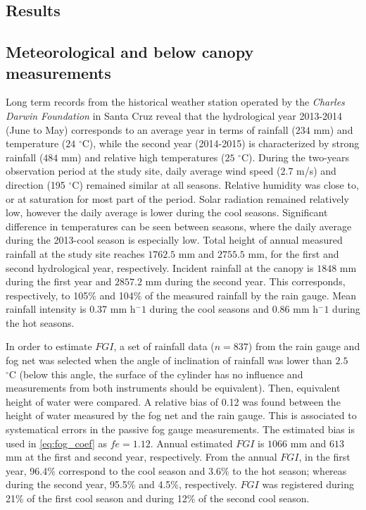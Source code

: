 \documentclass[a4paper,12pt]{article}
\begin{document}
\begin{linenumbers}
\section{Results}
\subsection{Meteorological and below canopy measurements}
Long term records from the historical weather station operated by the \emph{Charles Darwin Foundation} in Santa Cruz reveal that the hydrological year 2013-2014 (June to May) corresponds to an average year in terms of rainfall ($234$ $\mathrm{{mm}}$) and temperature ($24$ $\mathrm{^{\circ}C}$), while the second year (2014-2015) is characterized by strong rainfall ($484$ $\mathrm{{mm}}$) and relative high temperatures ($25$ $\mathrm{^{\circ}C}$). During the two-years observation period at the study site, daily average wind speed (2.7 m/s) and direction (195 $\mathrm{^{\circ}C}$) remained similar at all seasons. Relative humidity was close to, or at saturation for most part of the period. Solar radiation remained relatively low, however the daily average is lower during the cool seasons. Significant difference in temperatures can be seen between seasons, where the daily average during the 2013-cool season is especially low. Total height of annual measured rainfall at the study site reaches $1762.5$ $\mathrm{{mm}}$ and $2755.5$ $\mathrm{{mm}}$, for the first and second hydrological year, respectively. Incident rainfall at the canopy is $1848$ $\mathrm{{mm}}$ during the first year and $2857.2$ $\mathrm{{mm}}$ during the second year. This corresponds, respectively, to 105\% and 104\% of the measured rainfall by the rain gauge. Mean rainfall intensity is 0.37 mm h$^-1$ during the cool seasons and 0.86 mm h$^-1$ during the hot seasons.

In order to estimate $FGI$, a set of rainfall data ($n=837$) from the rain gauge and fog net was selected when the angle of inclination of rainfall was lower than $2.5$ $\mathrm{^{\circ}C}$ (below this angle, the surface of the cylinder has no influence and measurements from both instruments should be equivalent). Then, equivalent height of water were compared. A relative bias of 0.12 was found between the height of water measured by the fog net and the rain gauge. This is associated to systematical errors in the passive fog gauge measurements. The estimated bias is used in \autoref{eq:fog_coef} as $fe=1.12$. Annual estimated $FGI$ is $1066$ $\mathrm{{mm}}$ and $613$ $\mathrm{{mm}}$ at the first and second year, respectively. From the annual $FGI$, in the first year, 96.4\% correspond to the cool season and 3.6\% to the hot season; whereas during the second year, 95.5\% and 4.5\%, respectively. $FGI$ was registered during 21\% of the first cool season and during 12\% of the second cool season.
 

\end{linenumbers}
\end{document}
